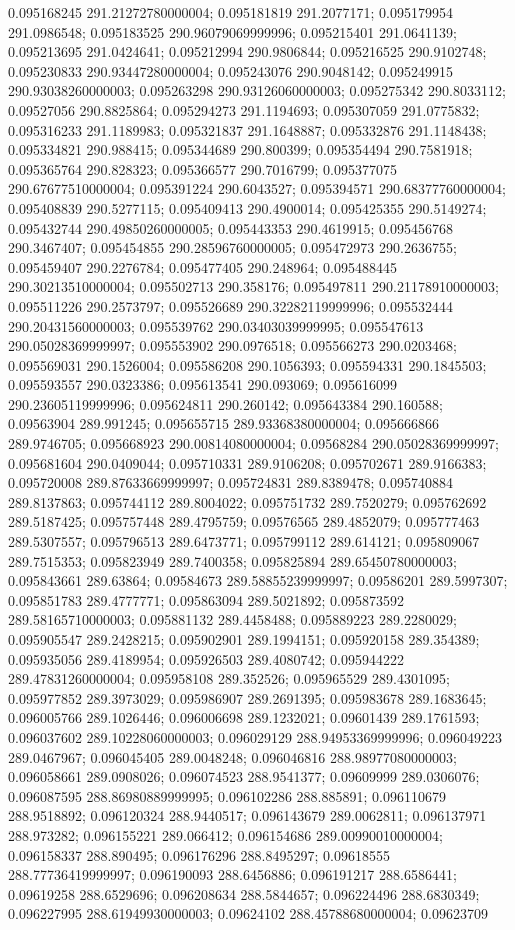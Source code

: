 0.095168245 291.21272780000004; 0.095181819 291.2077171; 0.095179954 291.0986548; 0.095183525 290.96079069999996; 0.095215401 291.0641139; 0.095213695 291.0424641; 0.095212994 290.9806844; 0.095216525 290.9102748; 0.095230833 290.93447280000004; 0.095243076 290.9048142; 0.095249915 290.93038260000003; 0.095263298 290.93126060000003; 0.095275342 290.8033112; 0.09527056 290.8825864; 0.095294273 291.1194693; 0.095307059 291.0775832; 0.095316233 291.1189983; 0.095321837 291.1648887; 0.095332876 291.1148438; 0.095334821 290.988415; 0.095344689 290.800399; 0.095354494 290.7581918; 0.095365764 290.828323; 0.095366577 290.7016799; 0.095377075 290.67677510000004; 0.095391224 290.6043527; 0.095394571 290.68377760000004; 0.095408839 290.5277115; 0.095409413 290.4900014; 0.095425355 290.5149274; 0.095432744 290.49850260000005; 0.095443353 290.4619915; 0.095456768 290.3467407; 0.095454855 290.28596760000005; 0.095472973 290.2636755; 0.095459407 290.2276784; 0.095477405 290.248964; 0.095488445 290.30213510000004; 0.095502713 290.358176; 0.095497811 290.21178910000003; 0.095511226 290.2573797; 0.095526689 290.32282119999996; 0.095532444 290.20431560000003; 0.095539762 290.03403039999995; 0.095547613 290.05028369999997; 0.095553902 290.0976518; 0.095566273 290.0203468; 0.095569031 290.1526004; 0.095586208 290.1056393; 0.095594331 290.1845503; 0.095593557 290.0323386; 0.095613541 290.093069; 0.095616099 290.23605119999996; 0.095624811 290.260142; 0.095643384 290.160588; 0.09563904 289.991245; 0.095655715 289.93368380000004; 0.095666866 289.9746705; 0.095668923 290.00814080000004; 0.09568284 290.05028369999997; 0.095681604 290.0409044; 0.095710331 289.9106208; 0.095702671 289.9166383; 0.095720008 289.87633669999997; 0.095724831 289.8389478; 0.095740884 289.8137863; 0.095744112 289.8004022; 0.095751732 289.7520279; 0.095762692 289.5187425; 0.095757448 289.4795759; 0.09576565 289.4852079; 0.095777463 289.5307557; 0.095796513 289.6473771; 0.095799112 289.614121; 0.095809067 289.7515353; 0.095823949 289.7400358; 0.095825894 289.65450780000003; 0.095843661 289.63864; 0.09584673 289.58855239999997; 0.09586201 289.5997307; 0.095851783 289.4777771; 0.095863094 289.5021892; 0.095873592 289.58165710000003; 0.095881132 289.4458488; 0.095889223 289.2280029; 0.095905547 289.2428215; 0.095902901 289.1994151; 0.095920158 289.354389; 0.095935056 289.4189954; 0.095926503 289.4080742; 0.095944222 289.47831260000004; 0.095958108 289.352526; 0.095965529 289.4301095; 0.095977852 289.3973029; 0.095986907 289.2691395; 0.095983678 289.1683645; 0.096005766 289.1026446; 0.096006698 289.1232021; 0.09601439 289.1761593; 0.096037602 289.10228060000003; 0.096029129 288.94953369999996; 0.096049223 289.0467967; 0.096045405 289.0048248; 0.096046816 288.98977080000003; 0.096058661 289.0908026; 0.096074523 288.9541377; 0.09609999 289.0306076; 0.096087595 288.86980889999995; 0.096102286 288.885891; 0.096110679 288.9518892; 0.096120324 288.9440517; 0.096143679 289.0062811; 0.096137971 288.973282; 0.096155221 289.066412; 0.096154686 289.00990010000004; 0.096158337 288.890495; 0.096176296 288.8495297; 0.09618555 288.77736419999997; 0.096190093 288.6456886; 0.096191217 288.6586441; 0.09619258 288.6529696; 0.096208634 288.5844657; 0.096224496 288.6830349; 0.096227995 288.61949930000003; 0.09624102 288.45788680000004; 0.09623709 